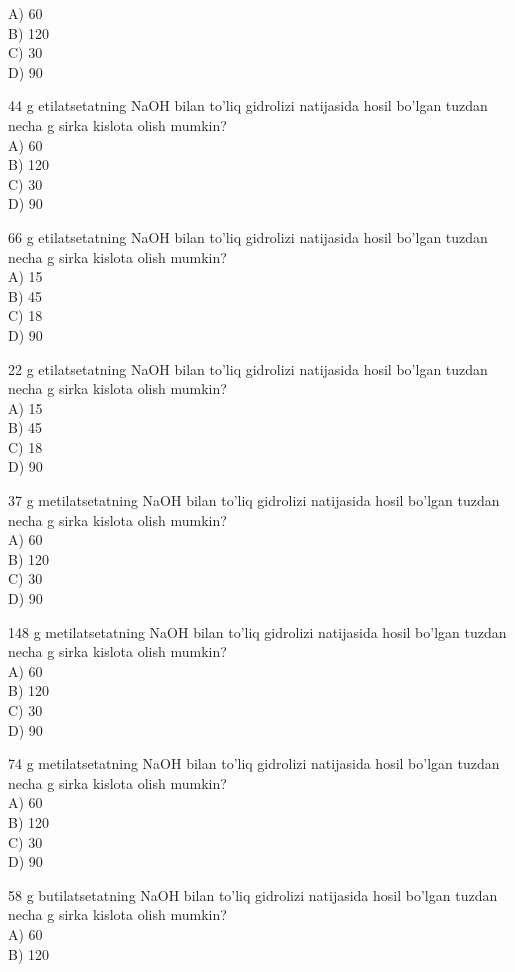 A) 60\\
B) 120\\
C) 30\\
D) 90
  \item 44 g etilatsetatning NaOH bilan to'liq gidrolizi natijasida hosil bo'lgan tuzdan necha g sirka kislota olish mumkin?\\
A) 60\\
B) 120\\
C) 30\\
D) 90
  \item 66 g etilatsetatning NaOH bilan to'liq gidrolizi natijasida hosil bo'lgan tuzdan necha g sirka kislota olish mumkin?\\
A) 15\\
B) 45\\
C) 18\\
D) 90
  \item 22 g etilatsetatning NaOH bilan to'liq gidrolizi natijasida hosil bo'lgan tuzdan necha g sirka kislota olish mumkin?\\
A) 15\\
B) 45\\
C) 18\\
D) 90
  \item 37 g metilatsetatning NaOH bilan to'liq gidrolizi natijasida hosil bo'lgan tuzdan necha g sirka kislota olish mumkin?\\
A) 60\\
B) 120\\
C) 30\\
D) 90
  \item 148 g metilatsetatning NaOH bilan to'liq gidrolizi natijasida hosil bo'lgan tuzdan necha g sirka kislota olish mumkin?\\
A) 60\\
B) 120\\
C) 30\\
D) 90
  \item 74 g metilatsetatning NaOH bilan to'liq gidrolizi natijasida hosil bo'lgan tuzdan necha g sirka kislota olish mumkin?\\
A) 60\\
B) 120\\
C) 30\\
D) 90
  \item 58 g butilatsetatning NaOH bilan to'liq gidrolizi natijasida hosil bo'lgan tuzdan necha g sirka kislota olish mumkin?\\
A) 60\\
B) 120\\
